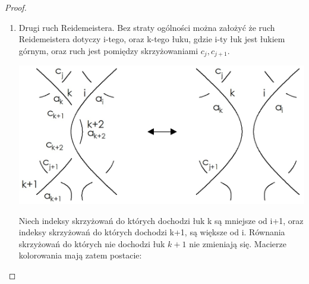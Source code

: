 \begin{proof}
\begin{enumerate}
\item Drugi ruch Reidemeistera. Bez straty ogólności można założyć że ruch Reidemeistera dotyczy i-tego, oraz k-tego łuku, gdzie i-ty łuk jest łukiem górnym, oraz ruch jest pomiędzy  skrzyżowaniami $ c_{j}, c_{j+1}$. 

\begin{center}
			\includegraphics[scale=0.25]{2/Obrazy/R2det}
\end{center}

Niech indeksy skrzyżowań do których dochodzi łuk k są mniejsze od i+1, oraz indeksy skrzyżowań do których dochodzi k+1, są większe od i. Równania skrzyżowań do których nie dochodzi łuk $k+1$ nie zmieniają się. Macierze kolorowania mają zatem postacie:

\begin{center}


\end{center}
\end{enumerate}
\end{proof}

